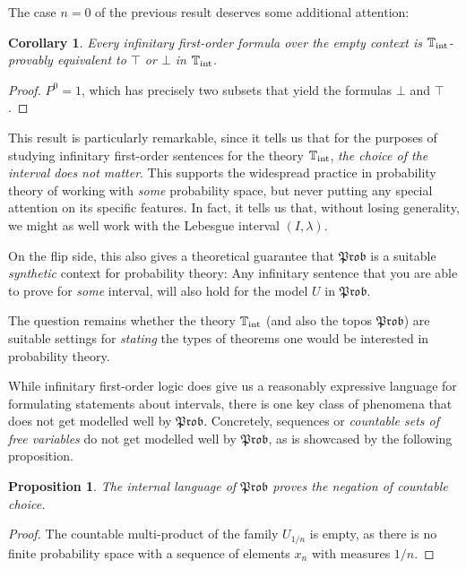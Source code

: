 \documentclass[a4paper]{amsproc}
\theoremstyle{plain}
\newtheorem{proposition}[theorem]{Proposition}
\newtheorem{corollary}[theorem]{Corollary}
\theoremstyle{definition}
\theoremstyle{remark}
\numberwithin{equation}{section}
\newcommand{\Prob}{\mathfrak{Prob}}
\begin{document}
The case $n = 0$ of the previous result deserves some additional attention:

\begin{corollary}
    Every infinitary first-order formula over the empty context is $\mathbb{T}_{\textup{int}}$-provably equivalent to $\top$ or $\bot$ in $\mathbb{T}_{\textup{int}}$.
\end{corollary}

\begin{proof}
    $P^0 = 1$, which has precisely two subsets that yield the formulas $\bot$ and $\top$.
\end{proof}

This result is particularly remarkable, since it tells us that for the purposes of studying infinitary first-order sentences for the theory $\mathbb{T}_{\textup{int}}$, \emph{the choice of the interval does not matter}. This supports the widespread practice in probability theory of working with \emph{some} probability space, but never putting any special attention on its specific features. In fact, it tells us that, without losing generality, we might as well work with the Lebesgue interval $(I,\lambda)$.

On the flip side, this also gives a theoretical guarantee that $\Prob$ is a suitable \emph{synthetic} context for probability theory: Any infinitary sentence that you are able to prove for \emph{some} interval, will also hold for the model $U$ in $\Prob$.

The question remains whether the theory $\mathbb{T}_{\textup{int}}$ (and also the topos $\Prob$) are suitable settings for \emph{stating} the types of theorems one would be interested in probability theory.

While infinitary first-order logic does give us a reasonably expressive language for formulating statements about intervals, there is one key class of phenomena that does not get modelled well by $\Prob$. Concretely, sequences or \emph{countable sets of free variables} do not get modelled well by $\Prob$, as is showcased by the following proposition.

\begin{proposition}\label{choice_failture}
    The internal language of $\Prob$ proves the negation of countable choice.
\end{proposition}
\begin{proof}
    The countable multi-product of the family $U_{1/n}$ is empty, as there is no finite probability space with a sequence of elements $x_n$ with measures $1/n$.
\end{proof}
\end{document}
